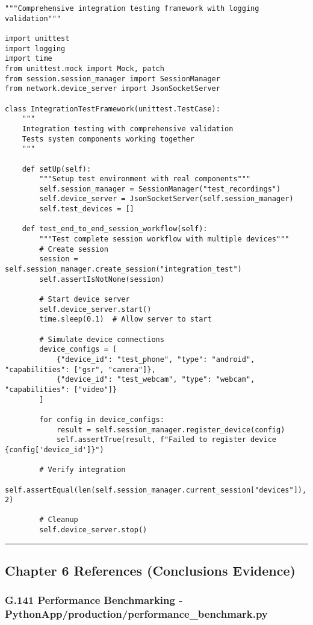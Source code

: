 \documentclass[12pt,a4paper]{article}
\begin{document}
\begin{verbatim}
"""Comprehensive integration testing framework with logging validation"""

import unittest
import logging
import time
from unittest.mock import Mock, patch
from session.session_manager import SessionManager
from network.device_server import JsonSocketServer

class IntegrationTestFramework(unittest.TestCase):
    """
    Integration testing with comprehensive validation
    Tests system components working together
    """
    
    def setUp(self):
        """Setup test environment with real components"""
        self.session_manager = SessionManager("test_recordings")
        self.device_server = JsonSocketServer(self.session_manager)
        self.test_devices = []
    
    def test_end_to_end_session_workflow(self):
        """Test complete session workflow with multiple devices"""
        # Create session
        session = self.session_manager.create_session("integration_test")
        self.assertIsNotNone(session)
        
        # Start device server
        self.device_server.start()
        time.sleep(0.1)  # Allow server to start
        
        # Simulate device connections
        device_configs = [
            {"device_id": "test_phone", "type": "android", "capabilities": ["gsr", "camera"]},
            {"device_id": "test_webcam", "type": "webcam", "capabilities": ["video"]}
        ]
        
        for config in device_configs:
            result = self.session_manager.register_device(config)
            self.assertTrue(result, f"Failed to register device {config['device_id']}")
        
        # Verify integration
        self.assertEqual(len(self.session_manager.current_session["devices"]), 2)
        
        # Cleanup
        self.device_server.stop()
\end{verbatim}

\hrule

\subsection{Chapter 6 References (Conclusions Evidence)}

\subsubsection{G.141 Performance Benchmarking - PythonApp/production/performance_benchmark.py}
\end{document}

